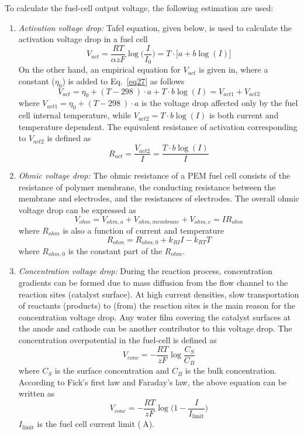 \documentclass[11pt,a4paper]{article}
\numberwithin{equation}{section}
\theoremstyle{it}
\theoremstyle{definition}
\begin{document}
To calculate the fuel-cell output voltage, the following estimation are used:
\begin{enumerate}
	\item \textit{Activation voltage drop:} Tafel equation, given below, is used to calculate the activation voltage drop in a fuel cell
	\begin{equation}\label{eq27}
		V_{act}=\frac{RT}{\alpha z F} \log\Big(\frac{I}{I_0}\Big) = T\cdot\Big[a+b\log(I)\Big]
	\end{equation}
	On the other hand, an empirical equation for $V_{act}$ is given in, where a constant ($\eta_0$) is added to Eq.~\eqref{eq27} as follows
	\begin{equation}\label{eq28}
		V_{act}=\eta_0+(T-\SI{298}{})\cdot a + T\cdot b\log(I)= V_{act1}+V_{act2}
	\end{equation}
	where $V_{act1}=\eta_0+(T-\SI{298}{})\cdot a$ is the voltage drop affected only by the fuel cell internal temperature, while $V_{act2}=T\cdot b\log(I)$ is both current and temperature dependent.
	The equivalent resistance of activation corresponding to $V_{act2}$ is defined as
	\begin{equation}\label{eq29}
		R_{act}=\frac{V_{act2}}{I} = \frac{T\cdot b\log(I)}{I}
	\end{equation}
	\item \textit{Ohmic voltage drop:} The ohmic resistance of a PEM fuel cell consists of the resistance of polymer membrane, the conducting resistance between the membrane and electrodes, and the resistances of electrodes. The overall ohmic voltage drop can be expressed as 
	\begin{equation}\label{eq30}
		V_{ohm} = V_{ohm,a} + V_{ohm,membrane} + V_{ohm,c} = IR_{ohm}
	\end{equation}
	where $R_{ohm}$ is also a function of current and temperature
	\begin{equation}\label{eq31}
		R_{ohm} = R_{ohm,0} + k_{RI}I - k_{RT}T
	\end{equation}
	where $R_{ohm,0}$ is the constant part of the $R_{ohm}$.
	\item \textit{Concentration voltage drop:} During the reaction process, concentration gradients can be formed due to mass diffusion from the flow channel to the reaction sites (catalyst surface). At high current densities, slow transportation of reactants (products) to (from) the reaction sites is the main reason for the concentration voltage drop. Any water film covering the catalyst surfaces at the anode and cathode can be another contributor to this voltage drop. The concentration overpotential in the fuel-cell is defined as
	\begin{equation}\label{eq32}
		V_{conc} = -\frac{RT}{zF}\log\frac{C_S}{C_B}
	\end{equation}
	where $C_S$ is the surface concentration and $C_B$ is the bulk concentration.
	According to Fick's first law and Faraday's law, the above equation can be written as 
	\begin{equation}\label{eq33}
		V_{conc}=-\frac{RT}{zF}\log\Big(1-\frac{I}{I_{\text{limit}}}\Big)
	\end{equation}  
$I_{\text{limit}}$ is the fuel cell current limit ($\SI{}{\ampere}$).


\end{enumerate}
\end{document}
